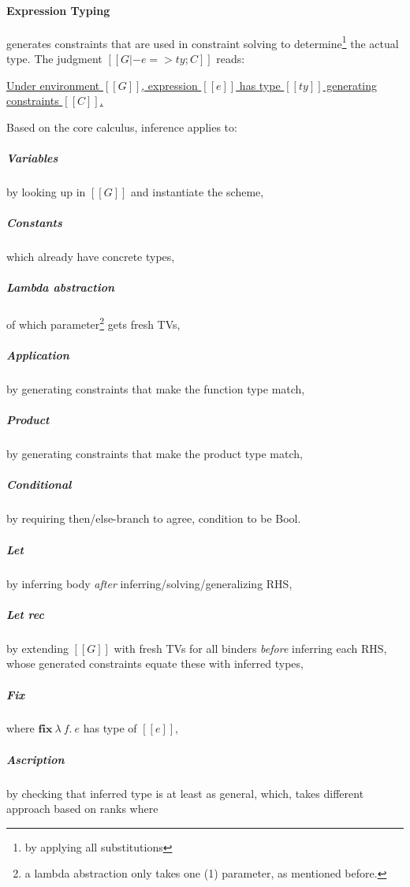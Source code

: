 \documentclass[a4paper, 11pt]{article}
\theoremstyle{remark}\newtheorem*{remark}{Remark}
\theoremstyle{definition}\newtheorem*{definition}{Definition}
\begin{document}
\paragraph{Expression Typing} generates constraints that are used in constraint solving
to determine\footnote{by applying all substitutions}
the actual type. The judgment \([[G |- e => ty ; C]]\) reads:

\underline{
Under environment \([[G]]\), expression \([[e]]\) has type \([[ty]]\) generating constraints \([[C]]\).
}

Based on the core calculus, inference applies to:
\subparagraph*{Variables} by looking up in \([[G]]\) and instantiate the scheme,
\subparagraph*{Constants} which already have concrete types,
\subparagraph*{Lambda abstraction} of which parameter\footnote{a lambda abstraction only takes one (1) parameter, as mentioned before.}
gets fresh TVs,
\subparagraph*{Application} by generating constraints that make the function type match,
\subparagraph*{Product} by generating constraints that make the product type match,
\subparagraph*{Conditional} by requiring then/else-branch to agree, condition to be Bool.
\subparagraph*{Let} by inferring body \emph{after} inferring/solving/generalizing RHS,
\subparagraph*{Let rec} by extending \([[G]]\) with fresh TVs for all binders \emph{before} inferring
each RHS, whose generated constraints equate these with inferred types,
\subparagraph*{Fix} where \(\mathbf{fix}\ \lambda\ f.\ e\) has type of \([[e]]\),
\subparagraph*{Ascription} by checking that inferred type is at least as general, which, takes different
approach based on ranks where
\end{document}
